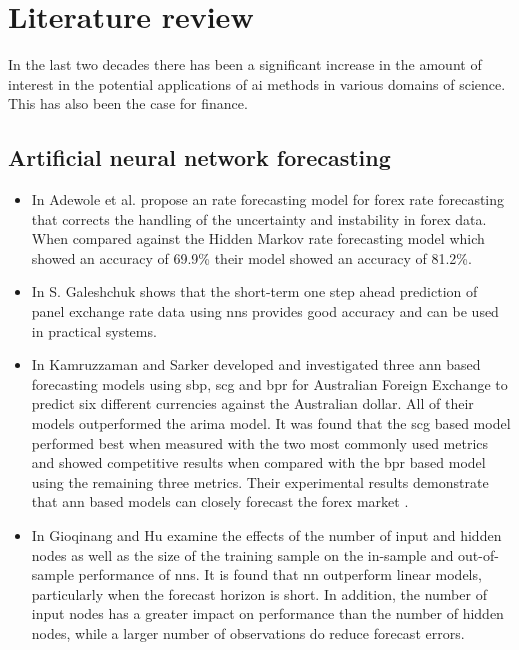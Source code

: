 \section{Literature review}\label{Literature review}

In the last two decades there has been a significant increase in the amount of interest in the potential applications of \gls{ai} methods in various domains of science. This has also been the case for finance.

\subsection{Artificial neural network forecasting}\label{Artificial neural networks forecasting}

\begin{itemize}
    \item In \cite{ann-2} Adewole et al. propose an   rate forecasting model for \gls{forex} rate forecasting that corrects the handling of the uncertainty and instability in \gls{forex} data. When compared against the Hidden Markov  rate forecasting model which showed an accuracy of 69.9\% their model showed an accuracy of 81.2\%.
    \item In \cite{performance} S. Galeshchuk shows that the short-term one step ahead prediction of panel exchange rate data using \glspl{nn} provides good accuracy and can be used in practical systems.
    \item In \cite{ann-1} Kamruzzaman and Sarker developed and investigated three \gls{ann} based forecasting models using \gls{sbp}, \gls{scg} and \gls{bpr} for Australian Foreign Exchange to predict six different currencies against the Australian dollar. All of their models outperformed the \gls{arima} model. It was found that the \gls{scg} based model performed best when measured with the two most commonly used metrics and showed competitive results when compared with the \gls{bpr} based model using the remaining three metrics. Their experimental results demonstrate that \gls{ann} based models can closely forecast the forex market \cite{ann-1}.
    \item In \cite{gbp-usd-forecasting} Gioqinang and Hu examine the effects of the number of input and hidden nodes as well as the size of the training sample on the in-sample and out-of-sample performance of \glspl{nn}. It is found that \gls{nn} outperform linear models, particularly when the forecast horizon is short. In addition, the number of input nodes has a greater impact on performance than the number of hidden nodes, while a larger number of observations do reduce forecast errors.
\end{itemize}


